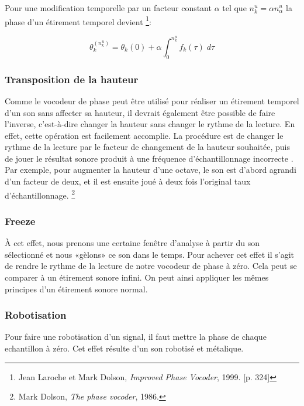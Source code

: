 Pour une modification temporelle par un facteur constant $\alpha$ tel que $n_k^u = \alpha n_\alpha^u$ la phase d'un étirement temporel devient \footnote{Jean Laroche et Mark Dolson, \textit{Improved Phase Vocoder}, 1999. [p. 324] \nocite{DoLa99}}:
    
    \begin{equation}
        \theta_k^(n_k^u) = \theta_k(0) + \alpha \int_0^{n_k^u}  f_k (\tau) \; d\tau
    \end{equation}

    \subsubsection{Transposition de la hauteur}

Comme le vocodeur de phase peut être utilisé pour réaliser un étirement temporel d'un son sans affecter sa hauteur, il devrait également être possible de faire l'inverse, c’est-à-dire changer la hauteur sans changer le rythme de la lecture. En effet, cette opération est facilement accomplie. La procédure est de changer le rythme de la lecture par le facteur de changement de la hauteur souhaitée, puis de jouer le résultat sonore produit à une fréquence d'échantillonnage \guillemotleft incorrecte \guillemotright. Par exemple, pour augmenter la hauteur d’une octave, le son est d'abord agrandi d'un facteur de deux, et il est ensuite joué à deux fois l'original taux d'échantillonnage. \footnote{Mark Dolson, \textit{ The phase vocoder}, 1986. \nocite{Dol86}}

    \subsubsection{Freeze}

À cet effet, nous prenons une certaine fenêtre d’analyse à partir du son sélectionné et nous «gèlons» ce son dans le temps. Pour achever cet effet il s'agit de rendre le rythme de la lecture de notre vocodeur de phase à zéro. Cela peut se comparer à un étirement sonore infini. On peut ainsi appliquer les mêmes principes d'un étirement sonore normal.

    \subsubsection{Robotisation}

Pour faire une robotisation d'un signal, il faut mettre la phase de chaque echantillon à zéro. Cet effet résulte d'un son robotisé et métalique.

